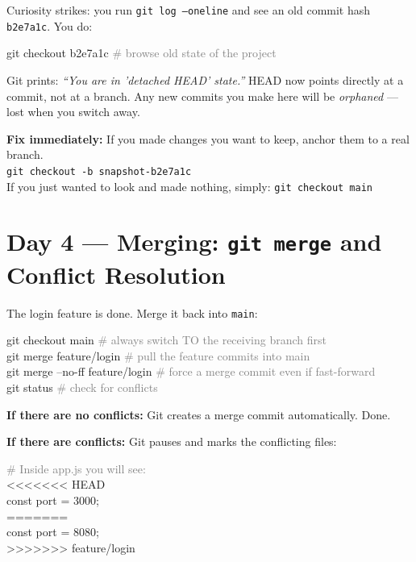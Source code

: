 \documentclass[10pt,a4paper]{article}
\newenvironment{codebox}{%
  \begin{mdframed}[backgroundcolor=codebg, linewidth=0pt,
    innerleftmargin=6pt, innerrightmargin=6pt,
    innertopmargin=4pt, innerbottommargin=4pt]%
  \small\ttfamily
}{%
  \end{mdframed}%
}
\newenvironment{warnbox}{%
  \begin{mdframed}[backgroundcolor=warnbg, linewidth=0.6pt,
    innerleftmargin=6pt, innerrightmargin=6pt,
    innertopmargin=3pt, innerbottommargin=3pt]%
  \small
}{%
  \end{mdframed}%
}
\newcommand{\cmd}[1]{\texttt{\small #1}}
\begin{document}
Curiosity strikes: you run \cmd{git log --oneline} and see an old commit hash \texttt{b2e7a1c}.
You do:

\begin{codebox}
git checkout b2e7a1c    \textcolor{gray}{\# browse old state of the project}
\end{codebox}

Git prints: \textit{``You are in 'detached HEAD' state.''}
HEAD now points directly at a commit, not at a branch.
Any new commits you make here will be \emph{orphaned} --- lost when you switch away.

\begin{warnbox}
\textbf{Fix immediately:} If you made changes you want to keep, anchor them to a real branch.\\
\texttt{git checkout -b snapshot-b2e7a1c}\\
If you just wanted to look and made nothing, simply: \texttt{git checkout main}
\end{warnbox}

\section{Day 4 --- Merging: \texttt{git merge} and Conflict Resolution}

The login feature is done. Merge it back into \texttt{main}:

\begin{codebox}
git checkout main                   \textcolor{gray}{\# always switch TO the receiving branch first}\\
git merge feature/login             \textcolor{gray}{\# pull the feature commits into main}\\
git merge --no-ff feature/login     \textcolor{gray}{\# force a merge commit even if fast-forward}\\
git status                          \textcolor{gray}{\# check for conflicts}
\end{codebox}

\textbf{If there are no conflicts:} Git creates a merge commit automatically. Done.

\textbf{If there are conflicts:} Git pauses and marks the conflicting files:

\begin{codebox}
\textcolor{gray}{\# Inside app.js you will see:}\\
<<<<<<< HEAD\\
const port = 3000;\\
=======\\
const port = 8080;\\
>>>>>>> feature/login
\end{codebox}
\end{document}
